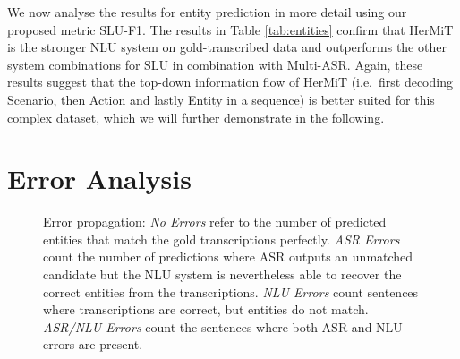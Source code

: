\documentclass[11pt,a4paper]{article}
\newcommand{\metricname}{SLU-F1}
\newcommand{\asr}{ASR}
\newcommand{\nlu}{NLU}
\newcommand{\hermit}{HerMiT}
\newcommand{\masr}{Multi-ASR}
\begin{document}
We now analyse the results for entity prediction in more detail using our proposed metric \metricname.
The results in Table \ref{tab:entities} confirm that \hermit{} is the stronger NLU system on gold-transcribed data
 and  outperforms the other system combinations for SLU
 in combination with \masr.
Again, these results suggest that the top-down information flow of \hermit{} (i.e.\ first decoding Scenario, then Action and lastly Entity in a sequence) is better suited for this complex dataset, which we will further demonstrate in the following.

\section{Error Analysis}\label{sec:error}



\begin{figure}
\centering
\footnotesize
{}
\caption{Error propagation: \textit{No Errors} refer to the number of predicted entities that match the gold transcriptions perfectly. \textit{\asr{} Errors} count the number of predictions where \asr{} outputs an unmatched candidate but the \nlu{} system is nevertheless able to recover the correct entities from the transcriptions. 
\textit{NLU Errors} count sentences where transcriptions are correct, but entities do not match. \textit{ASR/NLU Errors} count the sentences where both \asr{} and \nlu{} errors are present.}
\label{plt:error}
\end{figure}
\end{document}
